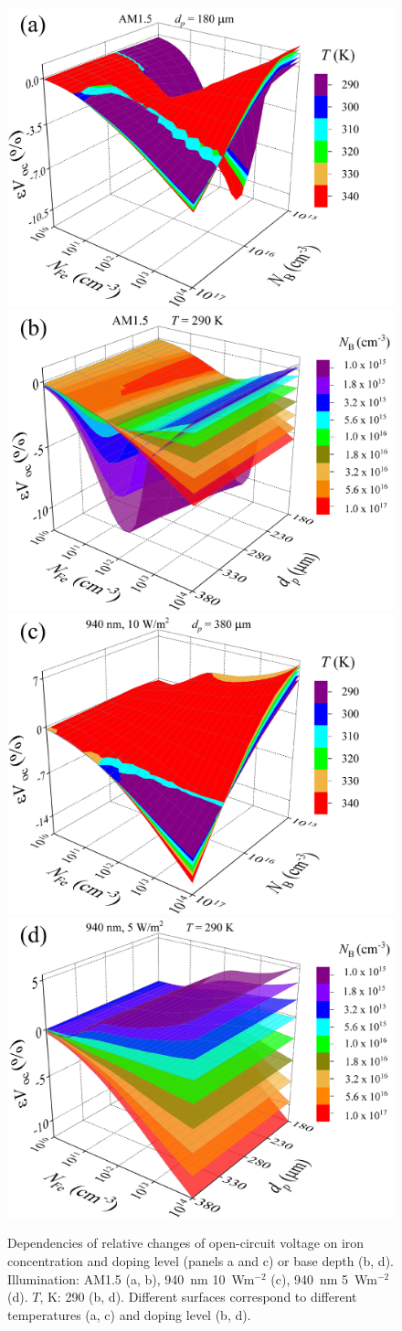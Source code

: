\documentclass[a4paper,fleqn]{cas-sc}
\begin{document}
\begin{figure}
	\centering
     \includegraphics[width=0.49\linewidth]{Fig6a.png}
     \includegraphics[width=0.49\linewidth]{Fig6b.png}
     \includegraphics[width=0.49\linewidth]{Fig6c.png}
     \includegraphics[width=0.49\linewidth]{Fig6d.png}
	  \caption{Dependencies of relative changes of open-circuit voltage on iron concentration and
       doping level (panels a and c) or base depth (b, d).
       Illumination: AM1.5 (a, b), 940~nm 10~Wm$^{-2}$ (c),  940~nm 5~Wm$^{-2}$ (d).
       $T$, K: 290 (b, d).
       Different surfaces correspond to different temperatures (a, c) and doping level (b, d).
}\label{fig6}
\end{figure}
\end{document}
